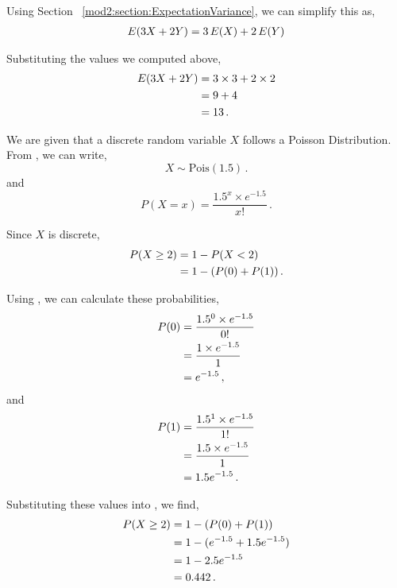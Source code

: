 \begin{subquestions}
\begin{subsubquestions}

\subsubquestion

Using Section ~\ref{mod2:section:ExpectationVariance}, we can simplify this as,
\begin{align}
	E(3X+2Y) & = 3\, E(X) + 2\, E(Y) \nonumber \\
\end{align}

Substituting the values we computed above,
\begin{align}
	E(3X+2Y) & = 3 \times 3 + 2 \times 2 \nonumber \\
	         & = 9+4 \nonumber \\
	         & = 13 \,.
\end{align}

\end{subsubquestions}


\subquestion

We are given that a discrete random variable $X$ follows a Poisson Distribution. From , we can write,
\begin{equation}
	X \sim \text{Pois}(1.5) \,.
\end{equation}
and 
\begin{equation}
	P(X = x) =\frac{ 1.5^x \times e^{-1.5}}{x!} \,. \label{2008J:q4:Pois1}
\end{equation}

Since $X$ is discrete,
\begin{align}
	P(X \geq 2) &= 1 - P(X < 2) \nonumber \\
					&= 1 - (P(0)+P(1)) \,. \label{2008J:q4:Pois2}
\end{align}

Using , we can calculate these probabilities,
\begin{align}
	P(0) & = \frac{ 1.5^0 \times e^{-1.5}}{0!} \nonumber \\
	     & = \frac{ 1 \times e^{-1.5}}{1} \nonumber \\
	     & = e^{-1.5} \,,
\end{align}
and
\begin{align}
	P(1) & = \frac{ 1.5^1 \times e^{-1.5}}{1!} \nonumber \\
	     & = \frac{1.5 \times e^{-1.5}}{1} \nonumber \\
	     & = 1.5e^{-1.5} \,.
\end{align}

Substituting these values into , we find,
\begin{align}	     
	    P(X \geq 2) & = 1 - (P(0)+P(1)) \nonumber \\
	            & = 1 - (e^{-1.5} + 1.5e^{-1.5}) \nonumber \\
	            & = 1-2.5e^{-1.5} \nonumber \\
	            & = 0.442 \,.
\end{align}

\end{subquestions}